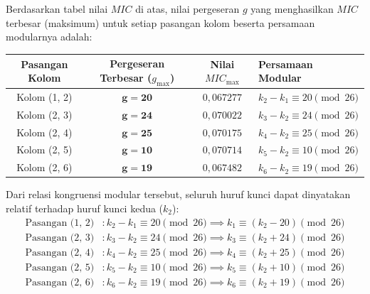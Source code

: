 \documentclass[11pt,a4paper]{article}
\begin{document}
Berdasarkan tabel nilai $MIC$ di atas, nilai pergeseran $g$ yang menghasilkan $MIC$ terbesar (maksimum) untuk setiap pasangan kolom beserta persamaan modularnya adalah:

\begin{table}[h!]
\centering
\begin{tabular}{c c c l}
\toprule
\textbf{Pasangan Kolom} & \textbf{Pergeseran Terbesar ($g_{\text{max}}$)} & \textbf{Nilai $MIC_{\text{max}}$} & \textbf{Persamaan Modular} \\
\midrule
Kolom (1, 2) & $\mathbf{g = 20}$ & $0{,}067277$ & $k_2 - k_1 \equiv 20 \pmod{26}$ \\
Kolom (2, 3) & $\mathbf{g = 24}$ & $0{,}070022$ & $k_3 - k_2 \equiv 24 \pmod{26}$ \\
Kolom (2, 4) & $\mathbf{g = 25}$ & $0{,}070175$ & $k_4 - k_2 \equiv 25 \pmod{26}$ \\
Kolom (2, 5) & $\mathbf{g = 10}$ & $0{,}070714$ & $k_5 - k_2 \equiv 10 \pmod{26}$ \\
Kolom (2, 6) & $\mathbf{g = 19}$ & $0{,}067482$ & $k_6 - k_2 \equiv 19 \pmod{26}$ \\
\bottomrule
\end{tabular}
\end{table}

Dari relasi kongruensi modular tersebut, seluruh huruf kunci dapat dinyatakan relatif terhadap huruf kunci kedua ($k_2$):
\begin{align*}
\text{Pasangan (1, 2)} &: k_2 - k_1 \equiv 20 \pmod{26} \implies k_1 \equiv (k_2 - 20) \pmod{26} \\
\text{Pasangan (2, 3)} &: k_3 - k_2 \equiv 24 \pmod{26} \implies k_3 \equiv (k_2 + 24) \pmod{26} \\
\text{Pasangan (2, 4)} &: k_4 - k_2 \equiv 25 \pmod{26} \implies k_4 \equiv (k_2 + 25) \pmod{26} \\
\text{Pasangan (2, 5)} &: k_5 - k_2 \equiv 10 \pmod{26} \implies k_5 \equiv (k_2 + 10) \pmod{26} \\
\text{Pasangan (2, 6)} &: k_6 - k_2 \equiv 19 \pmod{26} \implies k_6 \equiv (k_2 + 19) \pmod{26}
\end{align*}
\end{document}
